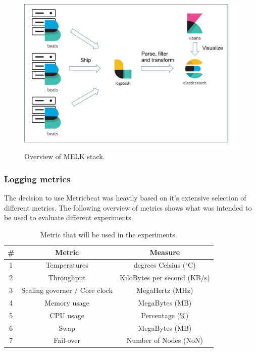 \documentclass[]{article}
\begin{document}
\begin{center}
	\begin{figure}[H]
		\includegraphics[width=\textwidth]{melk}
		\caption{Overview of MELK stack.}
		\label{fig:ssh}
	\end{figure}
\end{center}


\subsubsection{Logging metrics}
The decision to use Metricbeat was heavily based on it’s extensive selection of different metrics. The following overview of metrics shows what was intended to be used to evaluate different experiments.

\begin{table}[H]
	\begin{center}
		\begin{tabular}{ | c | c | c | }
			\hline
			\textbf{\#} & \textbf{Metric} & \textbf{Measure} \\ \hline
			
			1 & Temperatures & degrees Celsius ($^\circ$C) \\ \hline
			2 & Throughput & KiloBytes per second (KB/s) \\ \hline
			3 & Scaling governer / Core clock & MegaHertz (MHz) \\ \hline
			4 & Memory usage & MegaBytes (MB) \\ \hline
			5 & CPU usage & Percentage (\%) \\ \hline
			6 & Swap & MegaBytes (MB) \\ \hline
			7 & Fail-over & Number of Nodes (NoN)\\ \hline
		\end{tabular}
		\caption{Metric that will be used in the experiments.}
		\label{tab:specs}
	\end{center}
\end{table}
\end{document}
